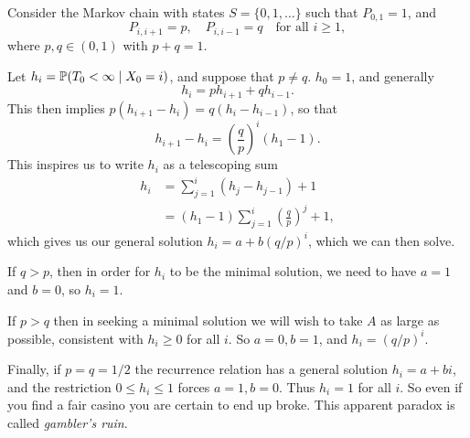 \documentclass[a4paper,11pt]{article}
\begin{document}
\begin{example}
	Consider the Markov chain with states $S = \{0, 1, \dots\}$ such that $P_{0, 1} = 1$, and
	$$
	P_{i, i+1} = p, \quad P_{i, i - 1} = q \quad \text{for all } i \geq 1,
	$$ 
	where $p, q \in (0, 1)$ with $p + q = 1$.

	\begin{center}
    \end{center}

	Let $h_i = {\mathbb{P}}(T_0 < \infty \mid X_0 = i)$, and suppose that $p \neq q$. $h_0 = 1$, and generally
	$$
		h_i = p h_{i + 1} + qh_{i - 1}.
	$$
	This then implies $p(h_{i + 1} - h_i) = q(h_{i} - h_{i - 1})$, so that
	$$
		h_{i+1} - h_{i}  = \left(\frac{q}{p}\right)^i (h_1 - 1).
	$$
	This inspires us to write $h_i$ as a telescoping sum
	\begin{align*}
		h_i &= \sum_{j = 1}^i (h_j - h_{j - 1}) + 1  \\
			&= (h_1 - 1) \sum_{j = 1}^i \left(\frac{q}{p}\right)^j + 1,
	\end{align*}
	which gives us our general solution $h_i = a + b(q/p)^i$, which we can then solve.

	If $q > p$, then in order for $h_i$ to be the minimal solution, we need to have $a = 1$ and $b = 0$, so $h_i = 1$.

    If $p>q$ then in seeking a minimal solution we will wish to take $A$ as large as possible, consistent with $h_{i} \geq 0$ for all $i$. So $a=0,b=1$, and $h_{i}=(q / p)^{i}$.

    Finally, if $p=q=1 / 2$ the recurrence relation has a general solution $h_{i}=a+b i$, and the restriction $0 \leq h_{i} \leq 1$ forces $a=1,b=0$. Thus $h_{i}=1$ for all $i$. So even if you find a fair casino you are certain to end up broke. This apparent paradox is called \textit{gambler's ruin}.
\end{example}
\end{document}

